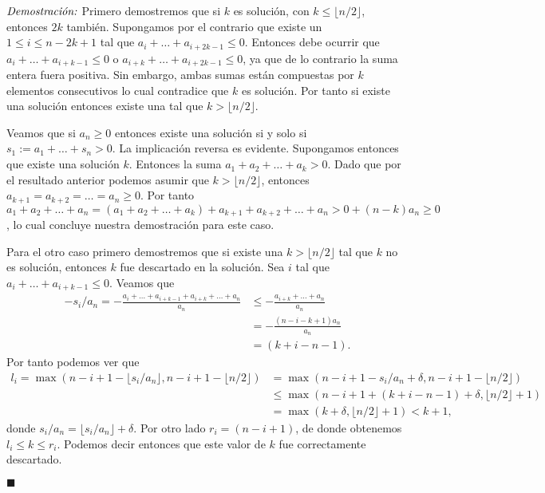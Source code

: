 \documentclass[10pt]{amsart}
\theoremstyle{definition}
\numberwithin{equation}{section}
\newcommand{\lqqd}{{\small $\blacksquare$}}
\newcommand{\Proof}[2]{{\vspace{1em} $\emph{Demostración:}$ \textbf{#1} #2 \lqqd \vspace{1em}}}
\begin{document}
        \Proof{}{
		Primero demostremos que si $k$ es soluci\'on, con $k \le \lfloor n/2 \rfloor $, entonces $2k$ tambi\'en. Supongamos por el contrario que existe un $1 \le i \le n - 2k + 1$ tal que $a_i + \dots + a_{i + 2k - 1} \le 0$. Entonces debe ocurrir que $a_i + \dots + a_{i + k - 1} \le 0$ o $a_{i + k} + \dots + a_{i + 2k - 1} \le 0$, ya que de lo contrario la suma entera fuera positiva. Sin embargo, ambas sumas est\'an compuestas por $k$ elementos consecutivos lo cual contradice que $k$ es soluci\'on. Por tanto si existe una soluci\'on entonces existe una tal que $k > \lfloor n/2 \rfloor$.
		
		Veamos que si $a_n \ge 0$ entonces existe una soluci\'on si y solo si $s_1 := a_1 + \dots + s_n > 0$. La implicaci\'on reversa es evidente. Supongamos entonces que existe una soluci\'on $k$. Entonces la suma $a_1 + a_2 + \dots + a_k > 0$. Dado que por el resultado anterior podemos asumir que $k > \lfloor n/2 \rfloor$, entonces $a_{k + 1} = a_{k + 2} = \dots = a_n \ge 0$. Por tanto $a_1 + a_2 + \dots + a_n = (a_1 + a_2 +\dots + a_k) + a_{k+1} + a_{k + 2} + \dots + a_n > 0 + (n - k)a_n \ge 0$, lo cual concluye nuestra demostraci\'on para este caso.
		
		Para el otro caso primero demostremos que si existe una $k > \lfloor n/2 \rfloor$ tal que $k$ no es soluci\'on, entonces $k$ fue descartado en la soluci\'on. Sea $i$ tal que $a_i + \dots + a_{i + k - 1} \le 0$. Veamos que
		\begin{align*}
			-s_i/a_n = -\frac{a_i + \dots + a_{i + k - 1} + a_{i + k} + \dots + a_n}{a_n} &\le - \frac{a_{i + k} + \dots + a_n}{a_n} \\ &= -\frac{(n - i - k + 1)a_n}{a_n}\\ &= (k + i - n - 1).
		\end{align*}
		Por tanto podemos ver que 
		\begin{align*}
		 l_i = \max( n - i + 1 - \lfloor s_i/a_n \rfloor, n - i  + 1 - \lfloor n/2 \rfloor) 
		 & = \max(n - i + 1 - s_i/a_n + \delta, n - i  + 1 - \lfloor n/2 \rfloor)
		 \\&\le \max(n- i + 1 + (k + i - n - 1) + \delta, \lfloor n/2 \rfloor + 1) \\ &= \max(k + \delta, \lfloor n/2 \rfloor + 1) < k + 1,
		\end{align*}
		donde $s_i/a_n = \lfloor s_i/a_n \rfloor + \delta$. Por otro lado $r_i = (n - i + 1)$, de donde obtenemos $l_i \le k \le r_i$. Podemos decir entonces que este valor de $k$ fue correctamente descartado.
		
}
\end{document}
